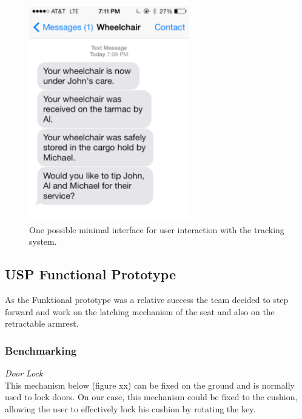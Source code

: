 \begin{figure}[h]
  \centering
     \includegraphics[width=7cm]{images/tips.png}
   \caption{One possible minimal interface for user interaction with the tracking system.}
  \label{fig:tips}
\end{figure}

\subsection{USP Functional Prototype}

As the Funktional prototype was a relative success the team decided to step forward and work on the latching mechanism of the seat and also on the retractable armrest.

\subsubsection{Benchmarking}

\noindent\emph{Door Lock}\\
This mechanism below (figure xx) can be fixed on the ground and is normally used to lock doors. On our case, this mechanism could be fixed to the cushion, allowing the user to effectively lock his cushion by rotating the key.\\

